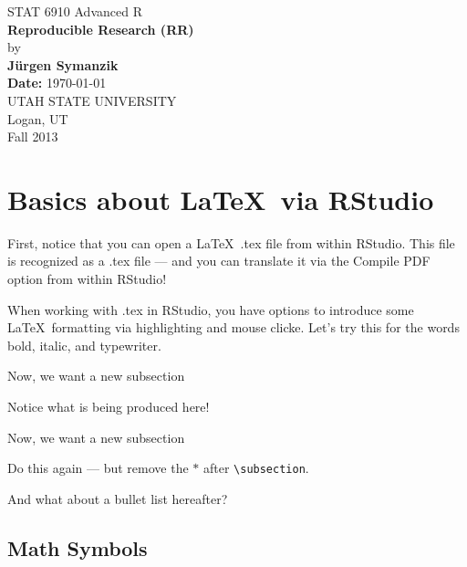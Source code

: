 \documentclass[12pt]{article}
\begin{document}
\begin{titlepage}

\begin{center}
{\large STAT 6910 Advanced R} \\[4cm]

{\LARGE \bf Reproducible Research (RR)} \\[1cm]
by \\[0.5cm]
{\bf J\"urgen Symanzik} \\[2.5cm]
{\bf Date:} \today \\[2cm]

UTAH STATE UNIVERSITY \\[0.5cm]
Logan, UT \\[0.5cm]
Fall 2013 \\[0.5cm]
\end{center}

\thispagestyle{empty}
\vfill
\end{titlepage}


\newpage 



\tableofcontents


\newpage



\section{Basics about \LaTeX\ via RStudio}

First, notice that you can open a \LaTeX\ .tex file from within RStudio.
This file is recognized as a .tex file --- and you can translate it 
via the Compile PDF option from within RStudio!

When working with .tex in RStudio, you have options to introduce
some \LaTeX\ formatting via highlighting and mouse clicke. Let's
try this for the words bold, italic, and typewriter.


Now, we want a new subsection

Notice what is being produced here!


Now, we want a new subsection

Do this again --- but remove the $*$ after \verb|\subsection|.


And what about a bullet list hereafter?


\subsection{Math Symbols}
\end{document}
